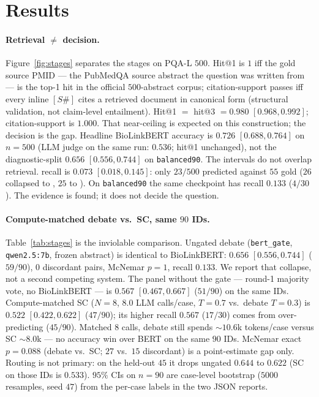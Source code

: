 \section{Results}
\label{sec:results}

\paragraph{Retrieval $\neq$ decision.}
Figure~\ref{fig:stages} separates the stages on
PQA-L $500$. Hit@1 is $1$ iff the gold source PMID --- the PubMedQA
source abstract the question was written from --- is the top-1 hit in
the official $500$-abstract corpus; citation-support passes iff every
inline $[S\#]$ cites a retrieved document in canonical form (structural
validation, not claim-level entailment). Hit@1 $=$ hit@3 $=0.980$
$[0.968,0.992]$; citation-support is $1.000$. That near-ceiling is
expected on this construction; the decision is the gap. Headline
BioLinkBERT accuracy is $0.726$ $[0.688,0.764]$ on $n{=}500$ (LLM judge
on the same run: $0.536$; hit@1 unchanged), not the diagnostic-split
$0.656$ $[0.556,0.744]$ on \texttt{balanced90}. The intervals do not
overlap retrieval. \maybe{} recall is $0.073$ $[0.018,0.145]$: only
$23/500$ predicted \maybe{} against $55$ gold ($26$ collapsed to
\yes{}, $25$ to \no{}). On \texttt{balanced90} the same checkpoint has
\maybe{} recall $0.133$ ($4/30$). The evidence is found; it does not
decide the question.

\paragraph{Compute-matched debate vs.\ SC, same $90$ IDs.}
Table~\ref{tab:stages} is the inviolable comparison. Ungated debate
(\texttt{bert\_gate}, \texttt{qwen2.5:7b}, frozen abstract) is
identical to BioLinkBERT: $0.656$ $[0.556,0.744]$ ($59/90$),
$0$ discordant pairs, McNemar $p{=}1$, \maybe{} recall $0.133$. We
report that collapse, not a second competing system. The panel without
the gate --- round-1 majority vote, no BioLinkBERT --- is $0.567$
$[0.467,0.667]$ ($51/90$) on the same IDs. Compute-matched SC ($N{=}8$,
$8.0$ LLM calls/case, $T{=}0.7$ vs.\ debate $T{=}0.3$) is $0.522$
$[0.422,0.622]$ ($47/90$); its higher \maybe{} recall $0.567$ ($17/30$)
comes from over-predicting \maybe{} ($45/90$). Matched $8$ calls,
debate still spends ${\sim}10.6$k tokens/case versus SC ${\sim}8.0$k
--- no accuracy win over BERT on the same $90$ IDs. McNemar exact
$p{=}0.088$ (debate vs.\ SC; $27$ vs.\ $15$ discordant) is a
point-estimate gap only. Routing is not primary: on the held-out $45$ it drops ungated
$0.644$ to $0.622$ (SC on those IDs is $0.533$). $95\%$ CIs on
$n{=}90$ are case-level bootstrap ($5000$ resamples, seed $47$) from
the per-case labels in the two JSON reports.


